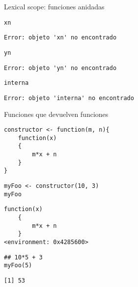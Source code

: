 \documentclass[xcolor={usenames,svgnames,dvipsnames}]{beamer}
\begin{document}
\begin{frame}[fragile,label={sec:orgheadline16}]{Lexical scope: funciones anidadas}
 \lstset{language=R,label= ,caption= ,captionpos=b,numbers=none}
\begin{lstlisting}
xn
\end{lstlisting}

\begin{verbatim}
Error: objeto 'xn' no encontrado
\end{verbatim}

\lstset{language=R,label= ,caption= ,captionpos=b,numbers=none}
\begin{lstlisting}
yn
\end{lstlisting}

\begin{verbatim}
Error: objeto 'yn' no encontrado
\end{verbatim}

\lstset{language=R,label= ,caption= ,captionpos=b,numbers=none}
\begin{lstlisting}
interna
\end{lstlisting}

\begin{verbatim}
Error: objeto 'interna' no encontrado
\end{verbatim}
\end{frame}

\begin{frame}[fragile,label={sec:orgheadline17}]{Funciones que devuelven funciones}
 \lstset{language=R,label= ,caption= ,captionpos=b,numbers=none}
\begin{lstlisting}
constructor <- function(m, n){
    function(x)
    {
        m*x + n
    }
}
\end{lstlisting}

\lstset{language=R,label= ,caption= ,captionpos=b,numbers=none}
\begin{lstlisting}
myFoo <- constructor(10, 3)
myFoo
\end{lstlisting}

\begin{verbatim}
function(x)
    {
        m*x + n
    }
<environment: 0x4285600>
\end{verbatim}

\lstset{language=R,label= ,caption= ,captionpos=b,numbers=none}
\begin{lstlisting}
## 10*5 + 3
myFoo(5)
\end{lstlisting}

\begin{verbatim}
[1] 53
\end{verbatim}
\end{frame}
\end{document}
